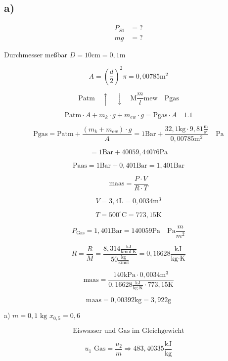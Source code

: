 

\subsection*{a)}

\begin{align*}
P_{S1} &= ? \\
mg &= ?
\end{align*}

Durchmesser meßbar \( D = 10 \text{cm} = 0{,}1 \text{m} \)

\[
A = \left( \frac{d}{2} \right)^2 \pi = 0{,}00785 \text{m}^2
\]

\[
\text{Patm} \quad \uparrow \quad \downarrow \quad \text{M} \frac{m}{l} \text{mew} \quad \text{Pgas}
\]

\[
\text{Patm} \cdot A + m_k \cdot g + m_{ew} \cdot g = \text{Pgas} \cdot A \quad \text{1.1}
\]

\[
\text{Pgas} = \text{Patm} + \frac{(m_k + m_{ew}) \cdot g}{A} = 1 \text{Bar} + \frac{32{,}1 \text{kg} \cdot 9{,}81 \frac{\text{m}}{\text{s}^2}}{0{,}00785 \text{m}^2} \quad \text{Pa}
\]

\[
= 1 \text{Bar} + 40 059{,}44076 \text{Pa}
\]

\[
\text{Paas} = 1 \text{Bar} + 0{,}401 \text{Bar} = 1{,}401 \text{Bar}
\]

\[
\text{maas} = \frac{P \cdot V}{R \cdot T}
\]

\[
V = 3{,}4 \text{L} = 0{,}0034 \text{m}^3
\]

\[
T = 500^\circ \text{C} = 773{,}15 \text{K}
\]

\[
P_{\text{Gas}} = 1{,}401 \text{Bar} = 140 059 \text{Pa} \quad \text{Pa} \frac{m}{m^2}
\]

\[
R = \frac{R}{M} = \frac{8{,}314 \frac{\text{kJ}}{\text{kmol} \cdot \text{K}}}{50 \frac{\text{kg}}{\text{kmol}}} = 0{,}16628 \frac{\text{kJ}}{\text{kg} \cdot \text{K}}
\]

\[
\text{maas} = \frac{140 \text{kPa} \cdot 0{,}0034 \text{m}^3}{0{,}16628 \frac{\text{kJ}}{\text{kg} \cdot \text{K}} \cdot 773{,}15 \text{K}}
\]

\[
\text{maas} = 0{,}00392 \text{kg} = 3{,}922 \text{g}
\]

a) $m = 0,1 \text{ kg}$ \hspace{1cm} $x_{0,5} = 0,6$

\[
\text{Eiswasser und Gas im Gleichgewicht}
\]

\[
u_1 \text{ Gas} = \frac{u_2}{m} \Rightarrow 483,40335 \frac{\text{kJ}}{\text{kg}}
\]

